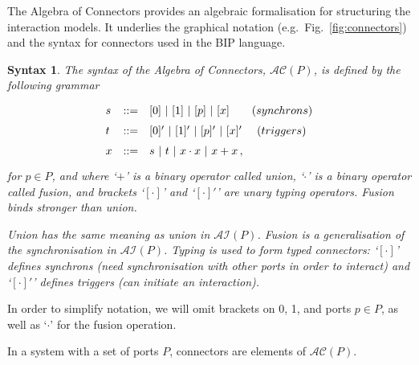 \documentclass{llncs}
\newcommand{\fig}[1]{Fig.~\ref{fig:#1}}
\newcommand{\eg}[1][\ ]{e.g.#1}
\newtheorem*{syntax}{Syntax}
\newcommand{\ai}{\ensuremath{\mathcal{AI}}}
\newcommand{\ac}{\ensuremath{\mathcal{AC}}}
\begin{document}
The Algebra of Connectors provides an algebraic formalisation for
structuring the interaction models.  It underlies the graphical
notation (\eg \fig{connectors}) and the syntax for connectors used in the BIP language.

\begin{syntax}
The syntax of the {\em Algebra of Connectors}, $\ac(P)$, is defined by the
following grammar
%
\begin{equation} \label{eq:acsynt}
  \renewcommand{\arraystretch}{1.5}
  \begin{array}{lcll}
    s & ::= & [0]\ |\ [1]\ |\ [p]\ |\ [x] \:\:\:\:\:\:\:\:\:(synchrons)\\
    t & ::= & [0]'\ |\ [1]'\ |\ [p]'\ |\ [x]'  \:\:\:\:\:\:   (triggers)\\
    x & ::= & s\ |\ t\ |\ x\cdot x\ |\ x + x\,, 
  \end{array}
\end{equation}
for $p\in P$, and where `$+$' is a binary operator called {\em union},
`$\cdot$' is a binary operator called {\em fusion}, and brackets
`$[\cdot]$' and `$[\cdot]'$' are unary {\em typing} operators.  Fusion
binds stronger than union.

Union has the same meaning as union in $\ai(P)$. Fusion is a
generalisation of the synchronisation in $\ai(P)$.  Typing is used to
form typed connectors: `$[\cdot]$' defines {\em synchrons} (need
synchronisation with other ports in order to interact) and
`$[\cdot]'$' defines {\em triggers} (can initiate an interaction).
\end{syntax}

In order to simplify notation, we will omit brackets on 0, 1, and
ports $p \in P$, as well as `$\cdot$' for the fusion operation.

\begin{definition}
 In a system with a set of ports $P$, connectors are elements of $\ac(P)$.
\end{definition} 
\end{document}
